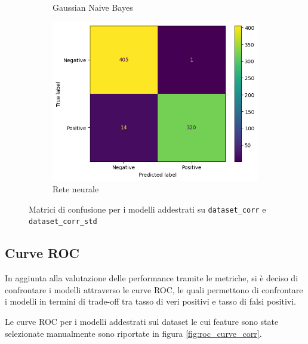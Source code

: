 \begin{figure}[!ht]
\begin{subfigure}{.45\textwidth}
        \caption{Gaussian Naive Bayes}
        \label{fig:matrice_di_confusione_per_GNB_corr}
    \end{subfigure}
    \hfill
    \begin{subfigure}{.45\textwidth}
        \centering
        \includegraphics[width=\textwidth]{img/rete/matrice_confusione.png}
        \caption{Rete neurale}
        \label{fig:matrice_di_confusione_per_NN_corr}
    \end{subfigure}
    \caption{Matrici di confusione per i modelli addestrati su \texttt{dataset\_corr} e \texttt{dataset\_corr\_std}}
    \label{fig:matrice_di_confusione_per_corr}
\end{figure}

\subsection{Curve ROC} \label{subsec:roc}
In aggiunta alla valutazione delle performance tramite le metriche, si è deciso
di confrontare i modelli attraverso le curve ROC, le quali permettono di
confrontare i modelli in termini di trade-off tra tasso di veri positivi e tasso
di falsi positivi.

Le curve ROC per i modelli addestrati sul dataset le cui feature sono state
selezionate manualmente sono riportate in figura \ref{fig:roc_curve_corr}.

